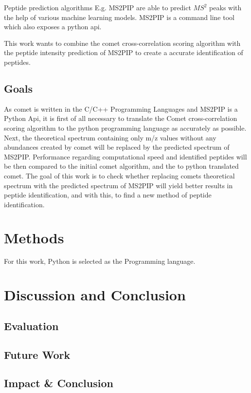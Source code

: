 \documentclass{article}
\begin{document}
Peptide prediction algorithms E.g. MS2PIP\cite{ms2pip} are able to predict \(MS^2\) peaks with the help of various machine learning models.
MS2PIP is a command line tool which also exposes a python api.

This work wants to combine the comet cross-correlation scoring algorithm
with the peptide intensity prediction of MS2PIP to create a accurate identification of peptides.


\subsection{Goals}
As comet is written in the C/C++ Programming Languages and MS2PIP is a Python Api, it is first of all necessary to translate the Comet cross-correlation scoring algorithm to the python programming language as accurately as possible. Next, the theoretical spectrum containing only m/z values without any abundances created by comet will be replaced by the predicted spectrum of MS2PIP. Performance regarding computational speed and identified peptides will be then compared to the initial comet algorithm, and the to python translated comet.
The goal of this work is to check whether replacing comets theoretical spectrum with the predicted spectrum of MS2PIP will yield better results in peptide identification, and with this, to find a new method of peptide identification.

\section{Methods}
For this work, Python is selected as the Programming language. 

\section{Discussion and Conclusion}
\subsection{Evaluation}
\subsection{Future Work}
\subsection{Impact \& Conclusion}


\printbibliography
\end{document}
